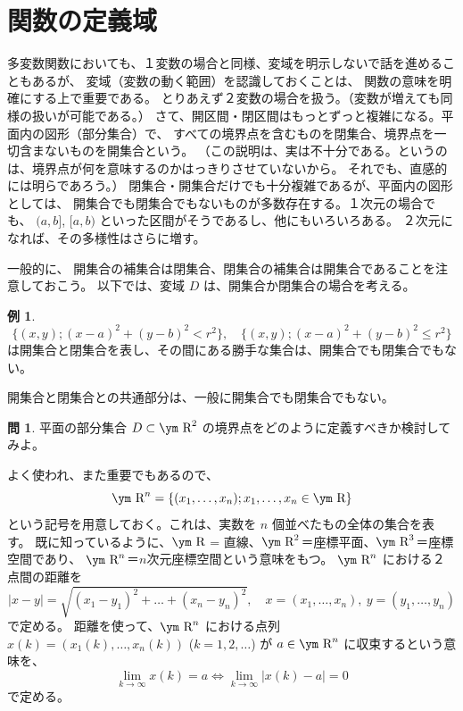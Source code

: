 \documentclass[a4paper]{jsarticle}
\theoremstyle{definition}
\newtheorem{Example}[Theorem]{例}
\newtheorem{Exercise}{問}%
\theoremstyle{remark}
\newcommand{\R}{\text{\ym R}}
\begin{document}
\section{関数の定義域}
多変数関数においても、１変数の場合と同様、変域を明示しないで話を進めることもあるが、
変域（変数の動く範囲）を認識しておくことは、
関数の意味を明確にする上で重要である。
とりあえず２変数の場合を扱う。（変数が増えても同様の扱いが可能である。）
さて、開区間・閉区間はもっとずっと複雑になる。平面内の図形（部分集合）で、
すべての境界点を含むものを閉集合、境界点を一切含まないものを開集合という。
（この説明は、実は不十分である。というのは、境界点が何を意味するのかはっきりさせていないから。
それでも、直感的には明らであろう。）
閉集合・開集合だけでも十分複雑であるが、平面内の図形としては、
開集合でも閉集合でもないものが多数存在する。１次元の場合でも、
$(a,b]$, $[a,b)$ といった区間がそうであるし、他にもいろいろある。
２次元になれば、その多様性はさらに増す。

一般的に、
開集合の補集合は閉集合、閉集合の補集合は開集合であることを注意しておこう。
以下では、変域 $D$ は、開集合か閉集合の場合を考える。

\begin{Example}
\[
\{ (x,y); (x-a)^2 + (y-b)^ 2< r^2 \}, \quad
\{ (x,y); (x-a)^2 + (y-b)^ 2\leq  r^2 \} 
\]
は開集合と閉集合を表し、その間にある勝手な集合は、開集合でも閉集合でもない。

開集合と閉集合との共通部分は、一般に開集合でも閉集合でもない。
\end{Example}

\begin{Exercise}
平面の部分集合 $D \subset \R^2$ の境界点をどのように定義すべきか検討してみよ。
\end{Exercise}

よく使われ、また重要でもあるので、
\[
\R^n = \{ (x_1,\dots,x_n); x_1,\dots,x_n \in \R \}
\] 
という記号を用意しておく。これは、実数を $n$ 個並べたもの全体の集合を表す。
既に知っているように、$\R$ = 直線、$\R^2$＝座標平面、$\R^3$＝座標空間であり、
$\R^n$＝$n$次元座標空間という意味をもつ。
$\R^n$ における２点間の距離を
\[
|x-y| = \sqrt{(x_1-y_1)^2 + \dots + (x_n-y_n)^2}, 
\quad 
x = (x_1,\dots,x_n),\ 
y = (y_1,\dots,y_n) 
\]
で定める。
距離を使って、$\R^n$ における点列 $x(k) = (x_1(k), \dots, x_n(k))$ ($k=1,2,\dots$) 
が $a \in \R^n$ に収束するという意味を、
\[
\lim_{k \to \infty} x(k) = a \iff \lim_{k \to \infty} |x(k)-a| = 0 
\]
で定める。
\end{document}
